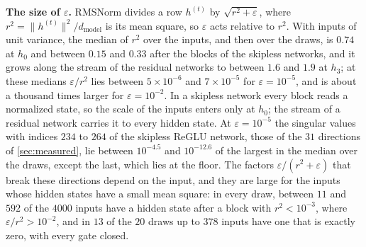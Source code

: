 \documentclass[10pt]{article}
\theoremstyle{definition}
\theoremstyle{remark}
\newcommand{\dm}{d_{\mathrm{model}}}
\newcommand{\norm}[1]{\lVert #1\rVert}
\newcommand{\para}[1]{\smallskip\noindent\textbf{#1}\hspace{0.5em}}
\begin{document}
\para{The size of $\varepsilon$.} RMSNorm divides a row $h^{(t)}$ by $\sqrt{r^2 + \varepsilon}$, where $r^2 = \norm{h^{(t)}}^2/\dm$ is its mean square, so $\varepsilon$ acts relative to $r^2$. With inputs of unit variance, the median of $r^2$ over the inputs, and then over the draws, is $0.74$ at $h_0$ and between $0.15$ and $0.33$ after the blocks of the skipless networks, and it grows along the stream of the residual networks to between $1.6$ and $1.9$ at $h_3$; at these medians $\varepsilon/r^2$ lies between $5\times10^{-6}$ and $7\times10^{-5}$ for $\varepsilon = 10^{-5}$, and is about a thousand times larger for $\varepsilon = 10^{-2}$. In a skipless network every block reads a normalized state, so the scale of the inputs enters only at $h_0$; the stream of a residual network carries it to every hidden state. At $\varepsilon = 10^{-5}$ the singular values with indices $234$ to $264$ of the skipless ReGLU network, those of the $31$ directions of \cref{sec:measured}, lie between $10^{-4.5}$ and $10^{-12.6}$ of the largest in the median over the draws, except the last, which lies at the floor. The factors $\varepsilon/(r^2 + \varepsilon)$ that break these directions depend on the input, and they are large for the inputs whose hidden states have a small mean square: in every draw, between $11$ and $592$ of the $4000$ inputs have a hidden state after a block with $r^2 < 10^{-3}$, where $\varepsilon/r^2 > 10^{-2}$, and in $13$ of the $20$ draws up to $378$ inputs have one that is exactly zero, with every gate closed.
\end{document}
